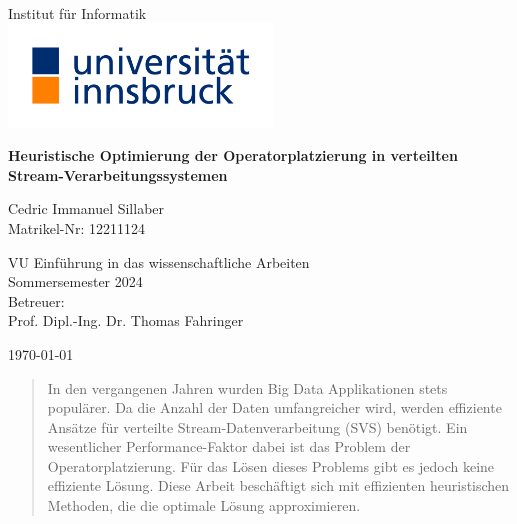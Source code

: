 \documentclass{article}
\begin{document}
\begin{titlepage}
      \begin{center}
          \Huge
           \\
          \vspace{1cm} %
          \Large
          Institut f\"ur Informatik \\
          \vspace{1cm}
          \includegraphics[width=7cm]{res/universitaet-innsbruck-logo.jpg}

          \Huge
          \textbf{Heuristische Optimierung der Operatorplatzierung in verteilten Stream-Verarbeitungssystemen} \\
          \vspace{3cm} %

          \Large
          Cedric Immanuel Sillaber \\
          Matrikel-Nr: 12211124
          
          \vspace{1cm}
          \large
          VU Einführung in das wissenschaftliche Arbeiten \\
          Sommersemester 2024\\
          \vspace{4cm}
          \normalsize
          Betreuer:\\ Prof. Dipl.-Ing. Dr. Thomas Fahringer
          
          \vfill 
          
          \large
          \today
      \end{center}
  \end{titlepage}
\begin{abstract}
In den vergangenen Jahren wurden Big Data Applikationen stets populärer. 
Da die Anzahl der Daten umfangreicher wird, werden effiziente Ansätze für 
verteilte Stream-Datenverarbeitung (SVS) benötigt.
Ein wesentlicher Performance-Faktor dabei ist das Problem der Operatorplatzierung.
Für das Lösen dieses Problems gibt es jedoch keine 
effiziente Lösung. Diese Arbeit beschäftigt sich mit effizienten heuristischen Methoden, die die optimale Lösung approximieren. 
\end{abstract}
\end{document}
